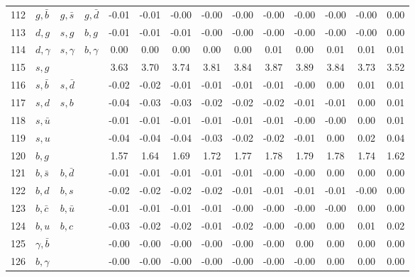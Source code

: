 \begin{tabularx}{\textwidth}{rXXX@{}S@{}S@{}S@{}S@{}S@{}S@{}S@{}S@{}S@{}S}
112 & $g, \bar b$      & $g, \bar s$       & $g, \bar d$      & -0.01 & -0.01 & -0.00 & -0.00 & -0.00 & -0.00 & -0.00 & -0.00 & -0.00 &  0.00 \\
113 & $d, g$           & $s,  g$           & $b,  g$          & -0.01 & -0.01 & -0.01 & -0.00 & -0.00 & -0.00 & -0.00 & -0.00 & -0.00 &  0.00 \\
114 & $d, \gamma$      & $s, \gamma$       & $b, \gamma$      &  0.00 &  0.00 &  0.00 &  0.00 &  0.00 &  0.01 &  0.00 &  0.01 &  0.01 &  0.01 \\
115 & $s, g$           &                   &                  &  3.63 &  3.70 &  3.74 &  3.81 &  3.84 &  3.87 &  3.89 &  3.84 &  3.73 &  3.52 \\
116 & $s, \bar b$      & $s, \bar d$       &                  & -0.02 & -0.02 & -0.01 & -0.01 & -0.01 & -0.01 & -0.00 &  0.00 &  0.01 &  0.01 \\
117 & $s, d$           & $s,  b$           &                  & -0.04 & -0.03 & -0.03 & -0.02 & -0.02 & -0.02 & -0.01 & -0.01 &  0.00 &  0.01 \\
118 & $s, \bar u$      &                   &                  & -0.01 & -0.01 & -0.01 & -0.01 & -0.01 & -0.01 & -0.00 & -0.00 &  0.00 &  0.01 \\
119 & $s, u$           &                   &                  & -0.04 & -0.04 & -0.04 & -0.03 & -0.02 & -0.02 & -0.01 &  0.00 &  0.02 &  0.04 \\
120 & $b, g$           &                   &                  &  1.57 &  1.64 &  1.69 &  1.72 &  1.77 &  1.78 &  1.79 &  1.78 &  1.74 &  1.62 \\
121 & $b, \bar s$      & $b, \bar d$       &                  & -0.01 & -0.01 & -0.01 & -0.01 & -0.01 & -0.00 & -0.00 &  0.00 &  0.00 &  0.00 \\
122 & $b, d$           & $b,  s$           &                  & -0.02 & -0.02 & -0.02 & -0.02 & -0.01 & -0.01 & -0.01 & -0.01 & -0.00 &  0.00 \\
123 & $b, \bar c$      & $b, \bar u$       &                  & -0.01 & -0.01 & -0.01 & -0.01 & -0.00 & -0.00 & -0.00 & -0.00 &  0.00 &  0.00 \\
124 & $b, u$           & $b,  c$           &                  & -0.03 & -0.02 & -0.02 & -0.01 & -0.02 & -0.00 & -0.00 &  0.00 &  0.01 &  0.02 \\
125 & $\gamma, \bar b$ &                   &                  & -0.00 & -0.00 & -0.00 & -0.00 & -0.00 & -0.00 &  0.00 &  0.00 &  0.00 &  0.00 \\
126 & $b, \gamma$      &                   &                  & -0.00 & -0.00 & -0.00 & -0.00 & -0.00 & -0.00 & -0.00 &  0.00 &  0.00 &  0.00 \\

\end{tabularx}
